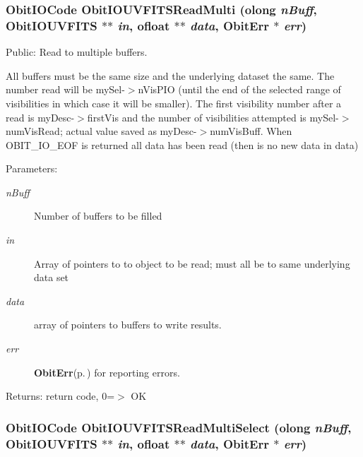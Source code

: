 \subsubsection{\setlength{\rightskip}{0pt plus 5cm}Obit\-IOCode Obit\-IOUVFITSRead\-Multi ({\bf olong} {\em n\-Buff}, {\bf Obit\-IOUVFITS} $\ast$$\ast$ {\em in}, {\bf ofloat} $\ast$$\ast$ {\em data}, {\bf Obit\-Err} $\ast$ {\em err})}\label{ObitIOUVFITS_8h_a15}


Public: Read to multiple buffers. 

All buffers must be the same size and the underlying dataset the same. The number read will be my\-Sel-$>$n\-Vis\-PIO (until the end of the selected range of visibilities in which case it will be smaller). The first visibility number after a read is my\-Desc-$>$first\-Vis and the number of visibilities attempted is my\-Sel-$>$num\-Vis\-Read; actual value saved as my\-Desc-$>$num\-Vis\-Buff. When OBIT\_\-IO\_\-EOF is returned all data has been read (then is no new data in data) \begin{Desc}
\item[Parameters:]
\begin{description}
\item[{\em n\-Buff}]Number of buffers to be filled \item[{\em in}]Array of pointers to to object to be read; must all be to same underlying data set \item[{\em data}]array of pointers to buffers to write results. \item[{\em err}]{\bf Obit\-Err}{\rm (p.\,\pageref{structObitErr})} for reporting errors. \end{description}
\end{Desc}
\begin{Desc}
\item[Returns:]return code, 0=$>$ OK \end{Desc}
\subsubsection{\setlength{\rightskip}{0pt plus 5cm}Obit\-IOCode Obit\-IOUVFITSRead\-Multi\-Select ({\bf olong} {\em n\-Buff}, {\bf Obit\-IOUVFITS} $\ast$$\ast$ {\em in}, {\bf ofloat} $\ast$$\ast$ {\em data}, {\bf Obit\-Err} $\ast$ {\em err})}\label{ObitIOUVFITS_8h_a17}


